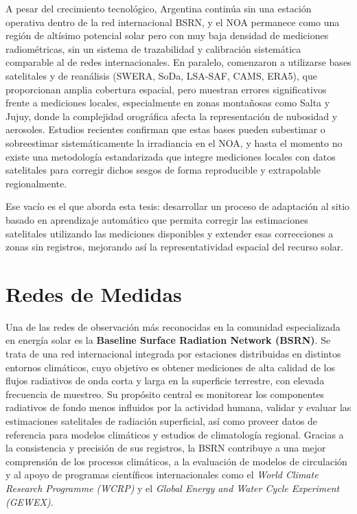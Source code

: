 A pesar del crecimiento tecnológico, Argentina continúa sin una estación operativa dentro de la red internacional BSRN, y el NOA permanece como una región de altísimo potencial solar pero con muy baja densidad de mediciones radiométricas, sin un sistema de trazabilidad y calibración sistemática comparable al de redes internacionales. En paralelo, comenzaron a utilizarse bases satelitales y de reanálisis (SWERA, SoDa, LSA-SAF, CAMS, ERA5), que proporcionan amplia cobertura espacial, pero muestran errores significativos frente a mediciones locales, especialmente en zonas montañosas como Salta y Jujuy, donde la complejidad orográfica afecta la representación de nubosidad y aerosoles. Estudios recientes confirman que estas bases pueden subestimar o sobreestimar sistemáticamente la irradiancia en el NOA, y hasta el momento no existe una metodología estandarizada que integre mediciones locales con datos satelitales para corregir dichos sesgos de forma reproducible y extrapolable regionalmente.

Ese vacío es el que aborda esta tesis: desarrollar un proceso de adaptación al sitio basado en aprendizaje automático que permita corregir las estimaciones satelitales utilizando las mediciones disponibles y extender esas correcciones a zonas sin registros, mejorando así la representatividad espacial del recurso solar.




\section{Redes de Medidas}

Una de las redes de observación más reconocidas en la comunidad especializada en energía solar es la \textbf{Baseline Surface Radiation Network (BSRN)}. Se trata de una red internacional integrada por estaciones distribuidas en distintos entornos climáticos, cuyo objetivo es obtener mediciones de alta calidad de los flujos radiativos de onda corta y larga en la superficie terrestre, con elevada frecuencia de muestreo. Su propósito central es monitorear los componentes radiativos de fondo menos influidos por la actividad humana, validar y evaluar las estimaciones satelitales de radiación superficial, así como proveer datos de referencia para modelos climáticos y estudios de climatología regional. Gracias a la consistencia y precisión de sus registros, la BSRN contribuye a una mejor comprensión de los procesos climáticos, a la evaluación de modelos de circulación y al apoyo de programas científicos internacionales como el \textit{World Climate Research Programme (WCRP)} y el \textit{Global Energy and Water Cycle Experiment (GEWEX)}.

